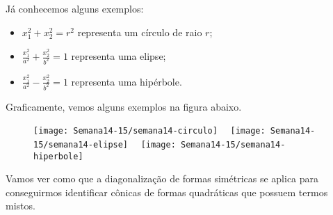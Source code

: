 Já conhecemos alguns exemplos:
\begin{itemize}
	\item $x_1^2 + x_2^2 = r^2$ representa um círculo de raio $r$;
	\item $\frac{x_1^2}{a^2} + \frac{x_2^2}{b^2} = 1$ representa uma elipse;
	\item $\frac{x_1^2}{a^2} - \frac{x_2^2}{b^2} = 1$ representa uma hipérbole.
\end{itemize} Graficamente, vemos alguns exemplos na figura abaixo.
\begin{figure}[h!]
	\begin{center}
		\texttt{[image: Semana14-15/semana14-circulo]} \ \ \texttt{[image: Semana14-15/semana14-elipse]} \ \ \texttt{[image: Semana14-15/semana14-hiperbole]}
	\end{center}
\end{figure}

\noindent Vamos ver como que a diagonalização de formas simétricas se aplica para conseguirmos identificar cônicas de formas quadráticas que possuem termos mistos.


